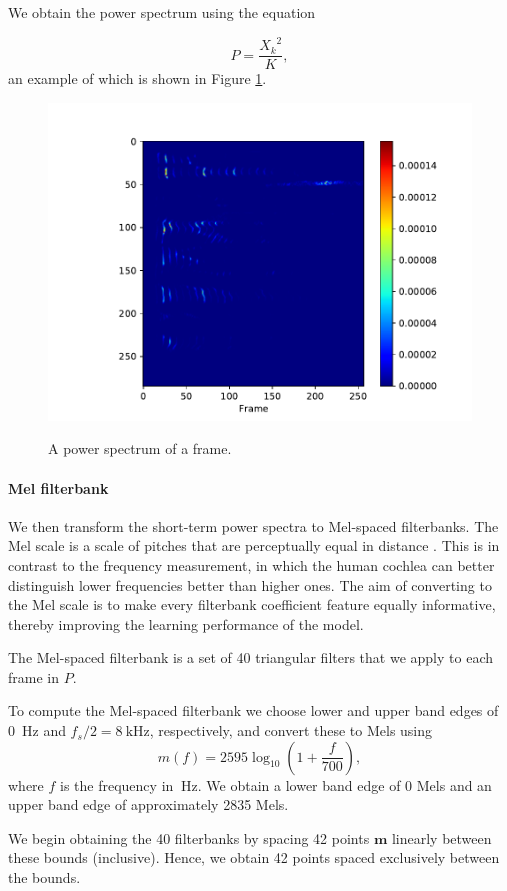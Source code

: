 			We obtain the power spectrum using the equation

			\begin{equation}\label{eq:powframes}
				P = \frac{{X_k}^2}{K},
			\end{equation}
			an example of which is shown in Figure \ref{fig:powframes}.

			\begin{figure}[ht]
				\centering
			    \includegraphics[width=.45\linewidth]{gfx/powframes}
			    \label{fig:powframes}
			    \caption{A power spectrum of a frame.}
			\end{figure}

		\paragraph{Mel filterbank}

			We then transform the short-term power spectra to Mel-spaced filterbanks.
			The Mel scale is a scale of pitches that are perceptually equal in distance \citep{stevens1937scale}.
			This is in contrast to the frequency measurement, in which the human cochlea can better distinguish lower frequencies better than higher ones.
			The aim of converting to the Mel scale is to make every filterbank coefficient feature equally informative, thereby improving the learning performance of the model.

			The Mel-spaced filterbank is a set of 40 triangular filters that we apply to each frame in $P$.

			To compute the Mel-spaced filterbank we choose lower and upper band edges of \SI{0}{\Hz} and $f_s/2 = \SI{8}{\kHz}$, respectively, and convert these to Mels using
			\begin{equation}
				m(f) = 2595\log_{10}\left(1 + \frac{f}{700}\right),
			\end{equation}
			where $f$ is the frequency in $\SI{}{\Hz}$.
			We obtain a lower band edge of 0 Mels and an upper band edge of approximately 2835 Mels.

			We begin obtaining the 40 filterbanks by spacing 42 points $\mathbf{m}$ linearly between these bounds (inclusive).
			Hence, we obtain 42 points spaced exclusively between the bounds.

